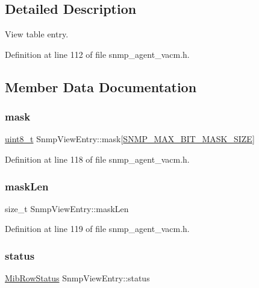 \subsection{Detailed Description}
View table entry. 

Definition at line 112 of file snmp\+\_\+agent\+\_\+vacm.\+h.



\subsection{Member Data Documentation}
\mbox{\label{structSnmpViewEntry_a692738ca6f958b97c6c1b9b58e2f5e91}} 
\subsubsection{\texorpdfstring{mask}{mask}}
{\footnotesize\ttfamily \hyperlink{stdint_8h_aba7bc1797add20fe3efdf37ced1182c5}{uint8\+\_\+t} Snmp\+View\+Entry\+::mask\mbox{[}\hyperlink{snmp__common_8h_a3f142408a36a20aa0c4214559ff23903}{S\+N\+M\+P\+\_\+\+M\+A\+X\+\_\+\+B\+I\+T\+\_\+\+M\+A\+S\+K\+\_\+\+S\+I\+ZE}\mbox{]}}



Definition at line 118 of file snmp\+\_\+agent\+\_\+vacm.\+h.

\mbox{\label{structSnmpViewEntry_a6f23a9a82dcf611acc03489e9e812fbe}} 
\subsubsection{\texorpdfstring{mask\+Len}{maskLen}}
{\footnotesize\ttfamily size\+\_\+t Snmp\+View\+Entry\+::mask\+Len}



Definition at line 119 of file snmp\+\_\+agent\+\_\+vacm.\+h.

\mbox{\label{structSnmpViewEntry_a6eae2c4516db476272ac128113d0748b}} 
\subsubsection{\texorpdfstring{status}{status}}
{\footnotesize\ttfamily \hyperlink{mib__common_8h_a40ce1ea958f5c3b04f841d76f5557097}{Mib\+Row\+Status} Snmp\+View\+Entry\+::status}



